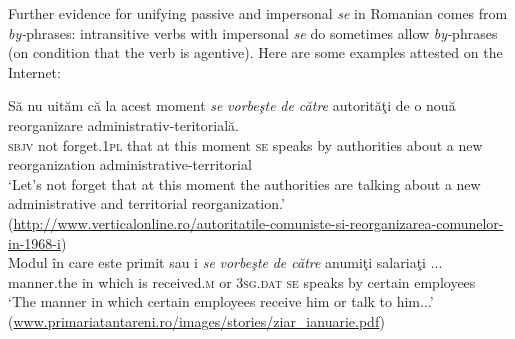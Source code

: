 \documentclass[output=paper]{langsci/langscibook}
\begin{document}
\ea%
    \label{ex:giurgea:9}
    \z
\z

Further evidence for unifying passive and impersonal \textit{se} in Romanian comes from \textit{by-}phrases: intransitive verbs with impersonal \textit{se} do sometimes allow \textit{by-}phrases (on condition that the verb is agentive). Here are some examples attested on the Internet:

\ea \label{ex:giurgea:10}
    \ea 
    \gll  Să    nu  uităm        că    la acest moment \emph{se} \emph{vorbeşte} \emph{de către}  autorităţi de    o nouă reorganizare administrativ-teritorială.\\
    \textsc{sbjv} not forget.\textsc{1pl} that at this   moment \textsc{se} speaks   by          authorities about a new  reorganization administrative-territorial\\
    \glt ‘Let’s not forget that at this moment the authorities are talking about a new administrative and territorial reorganization.’\\
    (\url{http://www.verticalonline.ro/autoritatile-comuniste-si-reorganizarea-comunelor-in-1968-i})\\
    \ex 
    \gll Modul        în care    este primit          sau i \emph{se} \emph{vorbeşte} \emph{de  către} anumiţi salariaţi ...\\
         manner.the in which is   received.\textsc{m}  or  \textsc{3sg}.\textsc{dat} \textsc{se} speaks    by certain  employees\\
    \glt ‘The manner in which certain employees receive him or talk to him...’\\
    (\url{www.primariatantareni.ro/images/stories/ziar\_ianuarie.pdf})\\
    \z
\z
\end{document}

